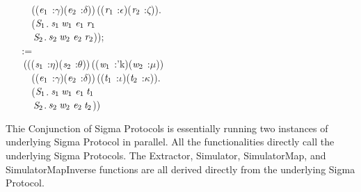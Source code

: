 \,\,\,\,\,\,\,\,\,\,\,\,\,\,\,\,((\ensuremath{\HOLBoundVar{e}\sb{\mathrm{1}}} :\ensuremath{\gamma})\HOLSymConst{,}(\ensuremath{\HOLBoundVar{e}\sb{\mathrm{2}}} :\ensuremath{\delta}))\,((\ensuremath{\HOLBoundVar{r}\sb{\mathrm{1}}} :\ensuremath{\epsilon})\HOLSymConst{,}(\ensuremath{\HOLBoundVar{r}\sb{\mathrm{2}}} :\ensuremath{\zeta})).\\
\,\,\,\,\,\,\,\,\,\,\,\,\,\,\,\,(\ensuremath{\HOLFreeVar{S}\sb{\mathrm{1}}}.\,\ensuremath{\HOLBoundVar{s}\sb{\mathrm{1}}}\,\ensuremath{\HOLBoundVar{w}\sb{\mathrm{1}}}\,\ensuremath{\HOLBoundVar{e}\sb{\mathrm{1}}}\,\ensuremath{\HOLBoundVar{r}\sb{\mathrm{1}}}\HOLSymConst{,}\\
\,\,\,\,\,\,\,\,\,\,\,\,\,\,\,\,\,\ensuremath{\HOLFreeVar{S}\sb{\mathrm{2}}}.\,\ensuremath{\HOLBoundVar{s}\sb{\mathrm{2}}}\,\ensuremath{\HOLBoundVar{w}\sb{\mathrm{2}}}\,\ensuremath{\HOLBoundVar{e}\sb{\mathrm{2}}}\,\ensuremath{\HOLBoundVar{r}\sb{\mathrm{2}}}));\\
\,\,\,\,\,\,\,\,\,\,:=\\
\,\,\,\,\,\,\,\,\,\,\,(\HOLTokenLambda{}((\ensuremath{\HOLBoundVar{s}\sb{\mathrm{1}}} :\ensuremath{\eta})\HOLSymConst{,}(\ensuremath{\HOLBoundVar{s}\sb{\mathrm{2}}} :\ensuremath{\theta}))\,((\ensuremath{\HOLBoundVar{w}\sb{\mathrm{1}}} :'k)\HOLSymConst{,}(\ensuremath{\HOLBoundVar{w}\sb{\mathrm{2}}} :\ensuremath{\mu}))\\
\,\,\,\,\,\,\,\,\,\,\,\,\,\,\,\,((\ensuremath{\HOLBoundVar{e}\sb{\mathrm{1}}} :\ensuremath{\gamma})\HOLSymConst{,}(\ensuremath{\HOLBoundVar{e}\sb{\mathrm{2}}} :\ensuremath{\delta}))\,((\ensuremath{\HOLBoundVar{t}\sb{\mathrm{1}}} :\ensuremath{\iota})\HOLSymConst{,}(\ensuremath{\HOLBoundVar{t}\sb{\mathrm{2}}} :\ensuremath{\kappa})).\\
\,\,\,\,\,\,\,\,\,\,\,\,\,\,\,\,(\ensuremath{\HOLFreeVar{S}\sb{\mathrm{1}}}.\,\ensuremath{\HOLBoundVar{s}\sb{\mathrm{1}}}\,\ensuremath{\HOLBoundVar{w}\sb{\mathrm{1}}}\,\ensuremath{\HOLBoundVar{e}\sb{\mathrm{1}}}\,\ensuremath{\HOLBoundVar{t}\sb{\mathrm{1}}}\HOLSymConst{,}\\
\,\,\,\,\,\,\,\,\,\,\,\,\,\,\,\,\,\ensuremath{\HOLFreeVar{S}\sb{\mathrm{2}}}.\,\ensuremath{\HOLBoundVar{s}\sb{\mathrm{2}}}\,\ensuremath{\HOLBoundVar{w}\sb{\mathrm{2}}}\,\ensuremath{\HOLBoundVar{e}\sb{\mathrm{2}}}\,\ensuremath{\HOLBoundVar{t}\sb{\mathrm{2}}}))\HOLTokenRightrec{}

Thie Conjunction of Sigma Protocols is essentially running two instances of underlying Sigma Protocol in parallel. 
All the functionalities directly call the underlying Sigma Protocols. 
The Extractor, Simulator, SimulatorMap, and SimulatorMapInverse functions are all derived directly from the underlying Sigma Protocol. 

